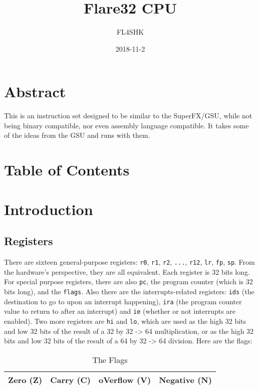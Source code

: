 \documentclass{article}
\title{Flare32 CPU}
\date{2018-11-2}
\author{FL4SHK}
\makeatletter
\renewcommand\tableofcontents{%
    \@starttoc{toc}%
}
\makeatother
\begin{document}
	\maketitle
	\newpage


	\doublespacing
	\section{Abstract}
	\setcounter{section}{-1}
	This is an instruction set designed to be similar to the SuperFX/GSU,
	while not being binary compatible, nor even assembly language
	compatible.  It takes some of the ideas from the GSU and runs with
	them.

	\newpage
	\singlespacing
	\section{Table of Contents}
	\tableofcontents
	\newpage

	\doublespacing
	\section{Introduction}
	\subsection{Registers}
	There are sixteen general-purpose registers:  \texttt{r0}, \texttt{r1},
	\texttt{r2}, \texttt{...}, \texttt{r12}, \texttt{lr}, \texttt{fp},
	\texttt{sp}.  From the hardware's perspective, they are all equivalent. 
	Each register is 32 bits long.  For special purpose registers, there
	are also \texttt{pc}, the program counter (which is 32 bits long), and
	the \texttt{flags}.  Also there are the interrupts-related registers:
	\texttt{ids} (the destination to go to upon an interrupt happening),
	\texttt{ira} (the program counter value to return to after an
	interrupt) and \texttt{ie} (whether or not interrupts are enabled).
	Two more registers are \texttt{hi} and \texttt{lo}, which are used as
	the high 32 bits and low 32 bits of the result of a 32 by 32 -> 64
	multiplication, or as the high 32 bits and low 32 bits of the result of
	a 64 by 32 -> 64 division.
	Here are the flags:

	\begin{table}[H]
		\begin{center}
			\caption{The Flags}
			\label{tab:flags}
			\begin{tabular}{|c|c|c|c|}
				\hline
				Zero (Z) & Carry (C) & oVerflow (V) & Negative (N)\\
				\hline
			\end{tabular}
		\end{center}
	\end{table}
\end{document}
